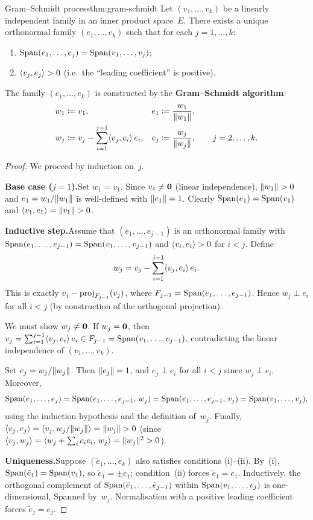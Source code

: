 \begin{theorem}{Gram--Schmidt process}{thm:gram-schmidt}
Let $(v_1,\ldots,v_k)$ be a linearly independent family in an inner
product space~$E$.  There exists a unique orthonormal family
$(e_1,\ldots,e_k)$ such that for each $j=1,\ldots,k$:
\begin{enumerate}[label=(\roman*)]
  \item $\operatorname{Span}(e_1,\ldots,e_j) = \operatorname{Span}(v_1,\ldots,v_j)$;
  \item $\langle v_j,e_j\rangle > 0$ (i.e.\ the ``leading coefficient'' is
    positive).
\end{enumerate}
The family $(e_1,\ldots,e_k)$ is constructed by the
\textbf{Gram--Schmidt algorithm}:
\begin{align*}
  w_1 &\coloneqq v_1, &
    e_1 &\coloneqq \frac{w_1}{\lVert w_1\rVert}, \\
  w_j &\coloneqq v_j - \sum_{i=1}^{j-1} \langle v_j,e_i\rangle\, e_i, &
    e_j &\coloneqq \frac{w_j}{\lVert w_j\rVert},
    \qquad j = 2,\ldots,k.
\end{align*}
\end{theorem}

\begin{proof}
We proceed by induction on~$j$.

\textbf{Base case ($j=1$).}\quad Set $w_1 = v_1$.  Since $v_1\neq\mathbf{0}$
(linear independence), $\lVert w_1\rVert>0$ and $e_1 = w_1/\lVert w_1\rVert$ is
well-defined with $\lVert e_1\rVert = 1$.  Clearly
$\operatorname{Span}(e_1) = \operatorname{Span}(v_1)$ and $\langle v_1,e_1\rangle = \lVert v_1\rVert > 0$.

\textbf{Inductive step.}\quad Assume that $(e_1,\ldots,e_{j-1})$ is an
orthonormal family with $\operatorname{Span}(e_1,\ldots,e_{j-1}) = \operatorname{Span}(v_1,\ldots,
v_{j-1})$ and $\langle v_i,e_i\rangle>0$ for $i<j$.  Define
\[
  w_j = v_j - \sum_{i=1}^{j-1}\langle v_j,e_i\rangle\, e_i.
\]
This is exactly $v_j - \operatorname{proj}_{F_{j-1}}(v_j)$, where
$F_{j-1} = \operatorname{Span}(e_1,\ldots,e_{j-1})$.  Hence $w_j\perp e_i$ for all
$i<j$ (by construction of the orthogonal projection).

We must show $w_j\neq\mathbf{0}$.  If $w_j = \mathbf{0}$, then
$v_j = \sum_{i=1}^{j-1}\langle v_j,e_i\rangle\,e_i\in F_{j-1} =
\operatorname{Span}(v_1,\ldots,v_{j-1})$, contradicting the linear independence
of $(v_1,\ldots,v_k)$.

Set $e_j = w_j/\lVert w_j\rVert$.  Then $\lVert e_j\rVert = 1$, and $e_j\perp e_i$
for all $i<j$ since $w_j\perp e_i$.  Moreover,
\[
  \operatorname{Span}(e_1,\ldots,e_j) = \operatorname{Span}(e_1,\ldots,e_{j-1},\,w_j)
    = \operatorname{Span}(e_1,\ldots,e_{j-1},\,v_j)
    = \operatorname{Span}(v_1,\ldots,v_j),
\]
using the induction hypothesis and the definition of~$w_j$.  Finally,
$\langle v_j,e_j\rangle = \langle v_j, w_j/\lVert w_j\rVert\rangle = \lVert w_j\rVert > 0$
(since $\langle v_j,w_j\rangle = \langle w_j + \sum_i c_i e_i,\, w_j\rangle =
\lVert w_j\rVert^2 > 0$).

\textbf{Uniqueness.}\quad Suppose $(\tilde{e}_1,\ldots,\tilde{e}_k)$
also satisfies conditions (i)--(ii).  By~(i),
$\operatorname{Span}(\tilde{e}_1) = \operatorname{Span}(v_1)$, so $\tilde{e}_1 = \pm e_1$;
condition~(ii) forces $\tilde{e}_1 = e_1$.  Inductively, the orthogonal
complement of $\operatorname{Span}(\tilde{e}_1,\ldots,\tilde{e}_{j-1})$ within
$\operatorname{Span}(v_1,\ldots,v_j)$ is one-dimensional, Spanned by~$w_j$.
Normalisation with a positive leading coefficient forces
$\tilde{e}_j = e_j$.
\end{proof}

